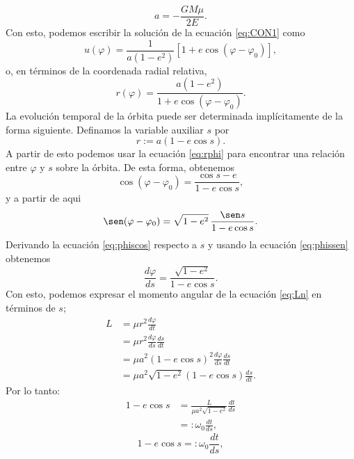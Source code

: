 \begin{equation}
    a= -\frac{GM\mu}{2E}. \label{eq:aE}
\end{equation}
Con esto, podemos escribir la solución de la ecuación \ref{eq:CON1} como 
\begin{equation}
    u(\varphi)=\frac{1}{a(1-e^2)}\left[1+e\cos
    (\varphi-\varphi_0)\right],
    \end{equation}
    o, en términos de la coordenada radial relativa,
    \begin{equation}\label{eq:rphi}
    r(\varphi)=\frac{a(1-e^2)}{1+e\cos(\varphi-\varphi_0)}.
\end{equation}
La evolución temporal de la órbita puede ser determinada implícitamente de la forma siguiente. Definamos la variable auxiliar
$s$ por
\begin{equation}\label{eq:rs}
    r:=a(1-e\cos s).
\end{equation}
A partir de esto podemos usar la ecuación \ref{eq:rphi} para encontrar una relación entre $\varphi$ y $s$ sobre la órbita.
De esta forma, obtenemos 
\begin{equation}\label{eq:phiscos}
    \cos(\varphi-\varphi_0)=\frac{\cos s -e}{1-e\cos s},
\end{equation}
y a partir de aqui
\begin{equation}\label{eq:phissen}
    \sen(\varphi-\varphi_0)=\sqrt{1-e^2}\,\frac{\sen s}{1-e\cos s}.
\end{equation}
Derivando la ecuación \ref{eq:phiscos} respecto a $s$ y usando la ecuación \ref{eq:phissen} obtenemos 
\begin{equation*}
    \frac{d\varphi}{ds}=\frac{\sqrt{1-e^2}}{1-e\cos s}.
\end{equation*}
Con esto, podemos expresar el momento angular de la ecuación \ref{eq:Ln} en términos de $s$;
\begin{align*}
    L & = \mu r^2 \frac{d\varphi}{dt} \\
    & = \mu r^2 \frac{d\varphi}{ds}\frac{ds}{dt} \\
    & = \mu a^2\left(1-e\cos s\right)^2 \frac{d\varphi}{ds}\frac{ds}{dt} \\
    & = \mu a^2\sqrt{1-e^2}\left(1-e\cos s\right) \frac{ds}{dt} .
\end{align*}
Por lo tanto:
\begin{align*}
    1-e\cos s & = \frac{L}{\mu a^2\sqrt{1-e^2}} \frac{dt}{ds} \\
    & =: \omega_0 \frac{dt}{ds},
\end{align*}
\begin{equation}
    1-e\cos s =: \omega_0 \frac{dt}{ds}, \label{eq:dtds}
\end{equation}
